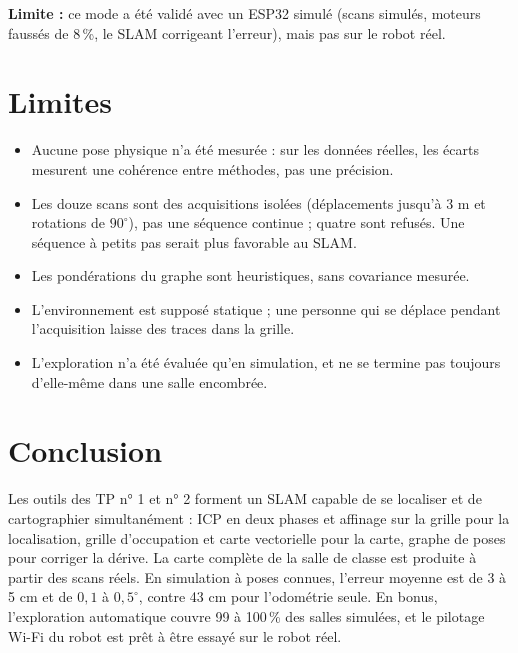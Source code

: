 \documentclass[11pt,a4paper]{article}
\begin{document}
\textbf{Limite :} ce mode a été validé avec un ESP32 simulé (scans simulés,
moteurs faussés de 8\,\%, le SLAM corrigeant l'erreur), mais pas sur le
robot réel.

\section{Limites}
\begin{itemize}
\item Aucune pose physique n'a été mesurée : sur les données réelles, les
écarts mesurent une cohérence entre méthodes, pas une précision.
\item Les douze scans sont des acquisitions isolées (déplacements jusqu'à
3 m et rotations de $90^\circ$), pas une séquence continue ; quatre sont
refusés. Une séquence à petits pas serait plus favorable au SLAM.
\item Les pondérations du graphe sont heuristiques, sans covariance mesurée.
\item L'environnement est supposé statique ; une personne qui se déplace
pendant l'acquisition laisse des traces dans la grille.
\item L'exploration n'a été évaluée qu'en simulation, et ne se termine pas
toujours d'elle-même dans une salle encombrée.
\end{itemize}

\section*{Conclusion}
Les outils des TP n° 1 et n° 2 forment un SLAM capable de se localiser et de
cartographier simultanément : ICP en deux phases et affinage sur la grille
pour la localisation, grille d'occupation et carte vectorielle pour la
carte, graphe de poses pour corriger la dérive. La carte complète de la
salle de classe est produite à partir des scans réels. En simulation à poses
connues, l'erreur moyenne est de 3 à 5 cm et de $0{,}1$ à $0{,}5^\circ$, contre
43 cm pour l'odométrie seule. En bonus, l'exploration automatique couvre
99 à 100\,\% des salles simulées, et le pilotage Wi-Fi du robot est prêt à
être essayé sur le robot réel.

\clearpage
\appendix
\end{document}
